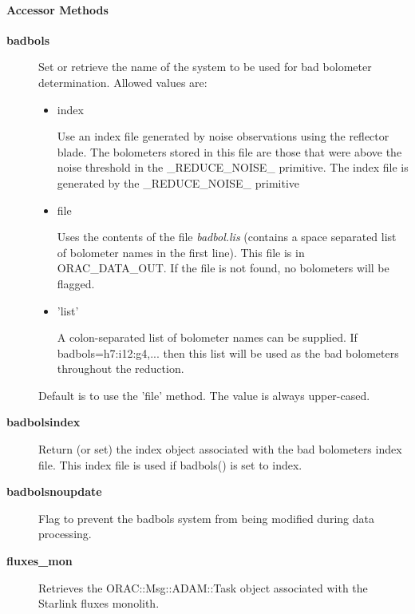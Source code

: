 \paragraph*{Accessor Methods\label{ORAC::Calib::SCUBA_Accessor_Methods}}\begin{description}
\item[\textbf{badbols}] \mbox{}

Set or retrieve the name of the system to be used for bad bolometer
determination. Allowed values are:

\begin{itemize}
\item index

Use an index file generated by noise observations
using the reflector blade. The bolometers stored in this
file are those that were above the noise threshold in 
the \_REDUCE\_NOISE\_ primitive. The index file is generated
by the \_REDUCE\_NOISE\_ primitive

\item file

Uses the contents of the file \emph{badbol.lis} (contains a space
separated list of bolometer names in the first line). This
file is in ORAC\_DATA\_OUT. If the file is not found, no
bolometers will be flagged.

\item 'list'

A colon-separated list of bolometer names can be supplied.
If badbols=h7:i12:g4,... then this list will be used
as the bad bolometers throughout the reduction.

\end{itemize}


Default is to use the 'file' method.
The value is always upper-cased.

\item[\textbf{badbolsindex}] \mbox{}

Return (or set) the index object associated with the bad bolometers
index file. This index file is used if badbols() is set to index.

\item[\textbf{badbolsnoupdate}] \mbox{}

Flag to prevent the badbols system from being modified during data
processing.

\item[\textbf{fluxes\_mon}] \mbox{}

Retrieves the ORAC::Msg::ADAM::Task object associated with
the Starlink fluxes monolith.




\end{description}
